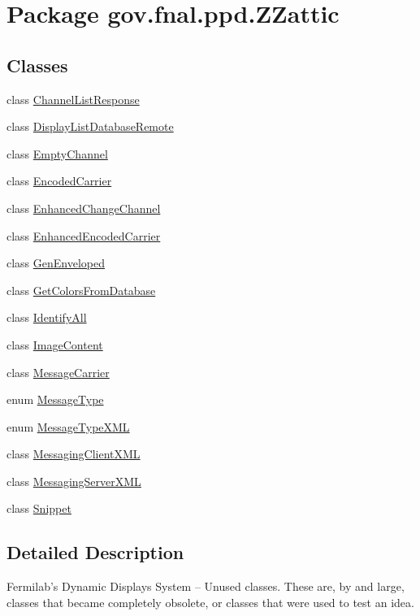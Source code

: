 \hypertarget{namespacegov_1_1fnal_1_1ppd_1_1ZZattic}{\section{Package gov.\-fnal.\-ppd.\-Z\-Zattic}
\label{namespacegov_1_1fnal_1_1ppd_1_1ZZattic}
}
\subsection*{Classes}
\begin{DoxyCompactItemize}
\item 
class \hyperlink{classgov_1_1fnal_1_1ppd_1_1ZZattic_1_1ChannelListResponse}{Channel\-List\-Response}
\item 
class \hyperlink{classgov_1_1fnal_1_1ppd_1_1ZZattic_1_1DisplayListDatabaseRemote}{Display\-List\-Database\-Remote}
\item 
class \hyperlink{classgov_1_1fnal_1_1ppd_1_1ZZattic_1_1EmptyChannel}{Empty\-Channel}
\item 
class \hyperlink{classgov_1_1fnal_1_1ppd_1_1ZZattic_1_1EncodedCarrier}{Encoded\-Carrier}
\item 
class \hyperlink{classgov_1_1fnal_1_1ppd_1_1ZZattic_1_1EnhancedChangeChannel}{Enhanced\-Change\-Channel}
\item 
class \hyperlink{classgov_1_1fnal_1_1ppd_1_1ZZattic_1_1EnhancedEncodedCarrier}{Enhanced\-Encoded\-Carrier}
\item 
class \hyperlink{classgov_1_1fnal_1_1ppd_1_1ZZattic_1_1GenEnveloped}{Gen\-Enveloped}
\item 
class \hyperlink{classgov_1_1fnal_1_1ppd_1_1ZZattic_1_1GetColorsFromDatabase}{Get\-Colors\-From\-Database}
\item 
class \hyperlink{classgov_1_1fnal_1_1ppd_1_1ZZattic_1_1IdentifyAll}{Identify\-All}
\item 
class \hyperlink{classgov_1_1fnal_1_1ppd_1_1ZZattic_1_1ImageContent}{Image\-Content}
\item 
class \hyperlink{classgov_1_1fnal_1_1ppd_1_1ZZattic_1_1MessageCarrier}{Message\-Carrier}
\item 
enum \hyperlink{enumgov_1_1fnal_1_1ppd_1_1ZZattic_1_1MessageType}{Message\-Type}
\item 
enum \hyperlink{enumgov_1_1fnal_1_1ppd_1_1ZZattic_1_1MessageTypeXML}{Message\-Type\-X\-M\-L}
\item 
class \hyperlink{classgov_1_1fnal_1_1ppd_1_1ZZattic_1_1MessagingClientXML}{Messaging\-Client\-X\-M\-L}
\item 
class \hyperlink{classgov_1_1fnal_1_1ppd_1_1ZZattic_1_1MessagingServerXML}{Messaging\-Server\-X\-M\-L}
\item 
class \hyperlink{classgov_1_1fnal_1_1ppd_1_1ZZattic_1_1Snippet}{Snippet}
\end{DoxyCompactItemize}


\subsection{Detailed Description}
Fermilab's Dynamic Displays System -- Unused classes. These are, by and large, classes that became completely obsolete, or classes that were used to test an idea. 